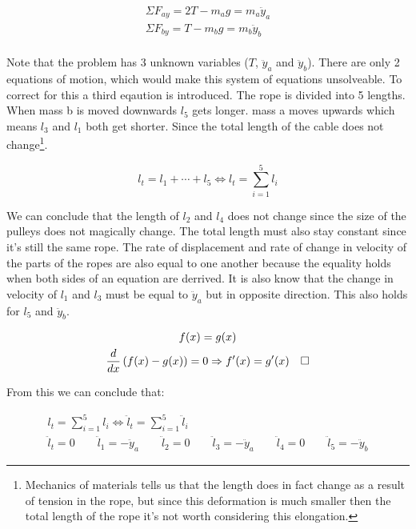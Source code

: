 \documentclass[11pt, a4paper]{article}
\newcommand*{\qed}{\hfill\ensuremath{\quad\square}}%
\begin{document}
\begin{gather}
    \Sigma F_{ay} = 2T - m_a g = m_a \ddot{y}_a \\
    \Sigma F_{by} = T - m_b g = m_b \ddot{y}_b
\end{gather}
\\
Note that the problem has 3 unknown variables ($T$, $\ddot{y}_a$ and $\ddot{y}_b$).
There are only 2 equations of motion, which would make this system of equations
unsolveable. To correct for this a third eqaution is introduced.
The rope is divided into 5 lengths. When mass b is moved downwards $l_5$ gets longer.
mass a moves upwards which means $l_3$ and $l_1$ both get shorter.
Since the total length of the cable does not change\footnote{Mechanics of materials tells us that the length does in fact change
as a result of tension in the rope, but since this deformation is much smaller then
the total length of the rope it's not worth considering this elongation.}.

\begin{equation}
    l_t = l_1 + \cdots + l_5 \Leftrightarrow l_t = \sum_{i=1}^{5} l_i
\end{equation}

We can conclude that the length of $l_2$ and $l_4$ does not change since the size
of the pulleys does not magically change. The total length must also stay constant
since it's still the same rope. The rate of displacement and rate of change in velocity
of the parts of the ropes are also equal to one another because the equality holds when both
sides of an equation are derrived. It is also know that the change in velocity of $l_1$ and $l_3$
must be equal to $\ddot{y}_a$ but in opposite direction. This also holds
for $l_5$ and $\ddot{y}_b$.

\begin{gather*}
    f(x) = g(x) \\
    \frac{d}{dx} \left( f(x) - g(x) \right) = 0 \Rightarrow f'(x) = g'(x) \qed
\end{gather*}

From this we can conclude that:

\begin{gather}
    l_t = \sum_{i=1}^{5} l_i \Leftrightarrow \ddot{l}_t = \sum_{i=1}^{5} \ddot{l}_i \\
    \ddot{l}_t = 0 \qquad \ddot{l}_1 = -\ddot{y}_a \qquad \ddot{l}_2 = 0 \qquad \ddot{l}_3 = -\ddot{y}_a \qquad \ddot{l}_4 = 0 \qquad \ddot{l}_5 = -\ddot{y}_b
\end{gather}
\end{document}

